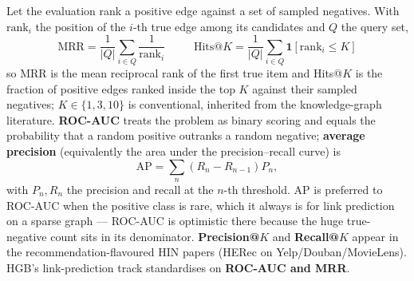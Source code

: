 Let the evaluation rank a positive edge against a set of sampled negatives. With
$\mathrm{rank}_i$ the position of the $i$-th true edge among its candidates and $Q$ the query set,
\[
  \boxed{\;\mathrm{MRR}=\frac{1}{|Q|}\sum_{i\in Q}\frac{1}{\mathrm{rank}_i}\;}
  \qquad
  \boxed{\;\mathrm{Hits}@K=\frac{1}{|Q|}\sum_{i\in Q}\mathbf{1}\!\left[\mathrm{rank}_i\le K\right]\;}
\]
so MRR is the mean reciprocal rank of the first true item and Hits@$K$ is the fraction of positive
edges ranked inside the top $K$ against their sampled negatives; $K\in\{1,3,10\}$ is conventional,
inherited from the knowledge-graph literature. \textbf{ROC-AUC} treats the problem as binary
scoring and equals the probability that a random positive outranks a random negative;
\textbf{average precision} (equivalently the area under the precision--recall curve) is
\[
  \mathrm{AP}=\sum_{n}\left(R_n-R_{n-1}\right)P_n ,
\]
with $P_n,R_n$ the precision and recall at the $n$-th threshold. AP is preferred to ROC-AUC when
the positive class is rare, which it always is for link prediction on a sparse graph --- ROC-AUC
is optimistic there because the huge true-negative count sits in its denominator.
\textbf{Precision@$K$} and \textbf{Recall@$K$} appear in the recommendation-flavoured HIN papers
(HERec on Yelp/Douban/MovieLens). HGB's link-prediction track standardises on \textbf{ROC-AUC and
MRR}.
